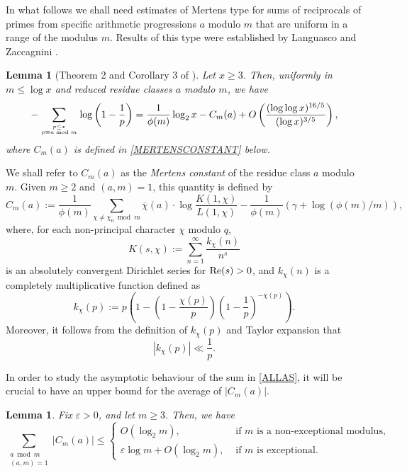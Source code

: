 \documentclass[12pt]{amsart}
\newtheorem{lem}[thm]{Lemma}
\theoremstyle{definition}
\numberwithin{equation}{section}
\newcommand{\re}{\textup{Re}}
\begin{document}
In what follows we shall need estimates of Mertens type for sums of reciprocals of primes from specific arithmetic progressions $a$ modulo $m$ that are uniform in a range of the modulus $m$. Results of this type were established by Languasco and Zaccagnini \cite{LaZ}.  
\begin{lem} [Theorem 2 and Corollary 3 of \cite{LaZ}] \label{LOGLZ}
Let $x \geq 3$.  Then, uniformly in $m \leq \log x$ and reduced residue classes $a$ modulo $m$, we have
$$
-\sum_{p \leq x \atop p \equiv a \bmod m} \log\left(1-\frac{1}{p}\right) = \frac{1}{\phi(m)} \log_2 x -  C_m(a) + O\left(\frac{(\log\log x)^{16/5}}{(\log x)^{3/5}}\right),
$$
where $C_m(a)$ is defined in \eqref{MERTENSCONSTANT} below.
\end{lem}




We shall refer to $C_m(a)$ as the \emph{Mertens constant} of the residue class $a$ modulo $m$. Given $m \geq 2$ and $(a, m)=1$, this quantity is defined by
\begin{equation}\label{MERTENSCONSTANT}
C_m(a):= \frac{1}{\phi(m)}\sum_{\chi\neq \chi_0 \bmod m} \overline{\chi}(a) \cdot \log \frac{K(1, \chi)}{L(1, \chi)}-\frac{1}{\phi(m)}\left(\gamma + \log(\phi(m)/m)\right),
\end{equation}
where, for each non-principal character $\chi$ modulo $q$,
$$K(s, \chi):= \sum_{n=1}^{\infty} \frac{k_{\chi}(n)}{n^s} $$ 
is an absolutely convergent Dirichlet series for $\re(s)>0$, and $k_{\chi}(n)$ is a completely multiplicative function defined as
\begin{equation}\label{KChi}
k_{\chi}(p):= p\left(1-\left(1-\frac{\chi(p)}{p}\right)\left(1-\frac 1p\right)^{-\chi(p)}\right).
\end{equation}
Moreover, it follows from the definition of $k_{\chi}(p)$ and Taylor expansion that
\begin{equation}\label{BoundK}
|k_{\chi}(p)|\ll \frac{1}{p}.
\end{equation}

In order to study the asymptotic behaviour of the sum in \eqref{ALLAS}, it will be crucial to have an upper bound for the average of $|C_m(a)|$. 
\begin{lem}\label{AverageMertens}
Fix $\varepsilon>0$, and let $m\geq 3$. Then, we have
$$
\sum_{\substack{a \bmod m\\ (a,m)=1}} \left|C_m(a)\right| \leq  \begin{cases} O(\log_2m), & \text{ if } m \text{ is a non-exceptional modulus},\\
\varepsilon \log m + O(\log_2m), &  \text{ if } m \text{ is exceptional}.\end{cases}
$$
\end{lem}
\end{document}
